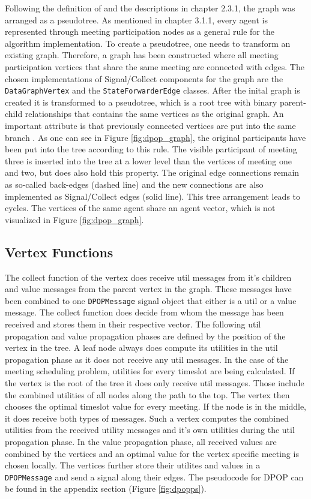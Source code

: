 Following the definition of \cite{Petcu2003} and the descriptions in chapter 2.3.1, the graph was arranged as a pseudotree. As mentioned in chapter 3.1.1, every agent is represented through meeting participation nodes as a general rule for the algorithm implementation. To create a pseudotree, one needs to transform an existing graph. Therefore, a graph has been constructed where all meeting participation vertices that share the same meeting are connected with edges. The chosen implementations of Signal/Collect components for the graph are the \texttt{DataGraphVertex} and the \texttt{StateForwarderEdge} classes. After the inital graph is created it is transformed to a pseudotree, which is a root tree with binary parent-child relationships that contains the same vertices as the original graph. An important attribute is that previously connected vertices are put into the same branch \cite{Petcu2003}. As one can see in Figure \ref{fig:dpop_graph}, the original participants have been put into the tree according to this rule. The visible participant of meeting three is inserted into the tree at a lower level than the vertices of meeting one and two, but does also hold this property. The original edge connections remain as so-called back-edges (dashed line) and the new connections are also implemented as Signal/Collect edges (solid line). This tree arrangement leads to cycles. The vertices of the same agent share an agent vector, which is not visualized in Figure \ref{fig:dpop_graph}.

\subsection{Vertex Functions}
The collect function of the vertex does receive util messages from it's children and value messages from the parent vertex in the graph. These messages have been combined to one \texttt{DPOPMessage} signal object that either is a util or a value message. The collect function does decide from whom the message has been received and stores them in their respective vector. The following util propagation and value propagation phases are defined by the position of the vertex in the tree. A leaf node always does compute its utilities in the util propagation phase as it does not receive any util messages. In the case of the meeting scheduling problem, utilities for every timeslot are being calculated. If the vertex is the root of the tree it does only receive util messages. Those include the combined utilities of all nodes along the path to the top. The vertex then chooses the optimal timeslot value for every meeting. If the node is in the middle, it does receive both types of messages. Such a vertex computes the combined utilities from the received utility messages and it's own utilities during the util propagation phase. In the value propagation phase, all received values are combined by the vertices and an optimal value for the vertex specific meeting is chosen locally. The vertices further store their utilites and values in a \texttt{DPOPMessage} and send a signal along their edges. The pseudocode for DPOP can be found in the appendix section (Figure \ref{fig:dpopps}).

